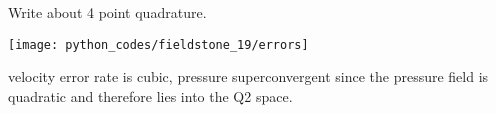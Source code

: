 {\color{red} Write about 4 point quadrature}.









\begin{center}
\texttt{[image: python\_codes/fieldstone\_19/errors]}
\end{center}

velocity error rate is cubic, pressure superconvergent since the pressure field
is quadratic and therefore lies into the Q2 space.
